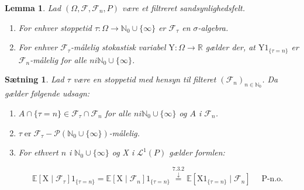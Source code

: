 \documentclass{article}
\newcommand{\1}{\mathbbm{1}}
\theoremstyle{boxed}
\newtheorem{lemma}[theorem]{Lemma}
\newtheorem{proposition}[theorem]{Sætning}
\begin{document}
\begin{theorem-box}
    \begin{lemma}
        Lad $\left(\Omega, \mathcal{F}, \mathcal{F}_n, P\right)$ være et filtreret sandsynlighedsfelt.
\begin{enumerate}
    \item[\textnormal{(i)}]  For enhver stoppetid $\tau: \Omega \rightarrow \mathbb{N}_0 \cup\{\infty\}$ er $\mathcal{F}_\tau$ en $\sigma$-algebra.
    \item[\textnormal{(ii)}]  For enhver $\mathcal{F}_\tau$-målelig stokastisk variabel $\mathrm{Y}: \Omega \rightarrow \mathbb{R}$ gælder der, at $\mathrm{Y} 1_{\{\tau=n\}}$ er $\mathcal{F}_n$-målelig for alle $n i \mathbb{N}_0 \cup\{\infty\}$.
\end{enumerate}
    \end{lemma}
\end{theorem-box}
\begin{theorem-box}
    \begin{proposition}
        Lad $\tau$ være en stoppetid med hensyn til filteret $\left(\mathcal{F}_n\right)_{n \in \mathbb{N}_0}$.
Da gælder følgende udsagn:
\begin{enumerate}
    \item[\textnormal{(i)}] $A \cap\{\tau=n\} \in \mathcal{F}_\tau \cap \mathcal{F}_n$ for alle $n i \mathbb{N}_0 \cup\{\infty\}$ og $A$ i $\mathcal{F}_n$.
    \item[\textnormal{(ii)}] $\tau \operatorname{er} \mathcal{F}_\tau-\mathcal{P}\left(\mathbb{N}_0 \cup\{\infty\}\right)$-målelig.
    \item[\textnormal{(iii)}] For ethvert $n$ i $\mathbb{N}_0 \cup\{\infty\}$ og X i $\mathcal{L}^1(P)$ gælder formlen:

    $$
    \mathbb{E}\left[\mathrm{X} \mid \mathcal{F}_\tau\right] 1_{\{\tau=n\}}=\mathbb{E}\left[\mathrm{X} \mid \mathcal{F}_n\right] 1_{\{\tau=n\}} \stackrel{7.3 .2}{\stackrel{\downarrow}{=}} \mathbb{E}\left[\mathrm{X} 1_{\{\tau=n\}} \mid \mathcal{F}_n\right] \quad \text { P-n.o. }
    $$
\end{enumerate}
    \end{proposition}
\end{theorem-box}
\end{document}
